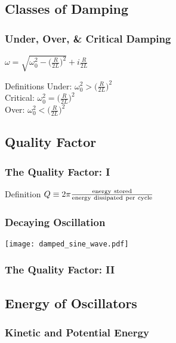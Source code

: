 \documentclass[pdf,hideothersubsections]{beamer}
\begin{document}
\subsection{Classes of Damping}
\begin{frame}
\frametitle{Under, Over, \& Critical Damping}

\begin{center}
$\omega = \sqrt{\omega_0^2 - \Big(\frac{R}{2 L}\Big)^2} + i \frac{R}{2 L}$ \\
\end{center}
\pause
\begin{block}{Definitions}
Under: $\omega_0^2 > \Big(\frac{R}{2 L}\Big)^2$ \\
Critical: $\omega_0^2 = \Big(\frac{R}{2 L}\Big)^2$ \\
Over: $\omega_0^2 < \Big(\frac{R}{2 L}\Big)^2$
\end{block}


\end{frame}


\subsection{Quality Factor}
\begin{frame}
\frametitle{The Quality Factor: I}

\begin{block}{Definition}
$Q \equiv 2 \pi \frac{\rm energy~stored}{\rm energy~dissipated~per~cycle}$
\end{block}

\end{frame}

\begin{frame}
\frametitle{Decaying Oscillation}

\centering
\texttt{[image: damped\_sine\_wave.pdf]}

\end{frame}

\begin{frame}
\frametitle{The Quality Factor: II}



\end{frame}


\subsection{Energy of Oscillators}
\begin{frame}
\frametitle{Kinetic and Potential Energy}


\end{frame}
\end{document}
